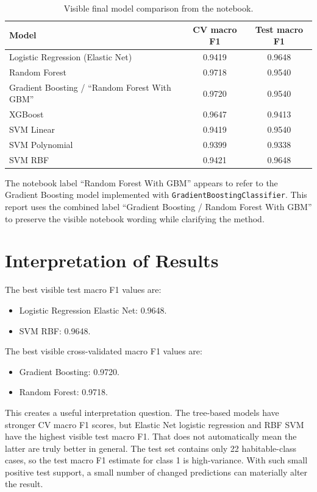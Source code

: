 \documentclass[11pt]{article}
\begin{document}
\begin{table}[H]
\centering
\caption{Visible final model comparison from the notebook.}
\label{tab:model-comparison}
\small
\begin{tabular}{lcc}
\toprule
Model & CV macro F1 & Test macro F1 \\
\midrule
Logistic Regression (Elastic Net) & 0.9419 & 0.9648 \\
Random Forest & 0.9718 & 0.9540 \\
Gradient Boosting / ``Random Forest With GBM'' & 0.9720 & 0.9540 \\
XGBoost & 0.9647 & 0.9413 \\
SVM Linear & 0.9419 & 0.9540 \\
SVM Polynomial & 0.9399 & 0.9338 \\
SVM RBF & 0.9421 & 0.9648 \\
\bottomrule
\end{tabular}
\end{table}

The notebook label ``Random Forest With GBM'' appears to refer to the Gradient Boosting model implemented with \texttt{GradientBoostingClassifier}. This report uses the combined label ``Gradient Boosting / Random Forest With GBM'' to preserve the visible notebook wording while clarifying the method.

\section{Interpretation of Results}

The best visible test macro F1 values are:

\begin{itemize}
  \item Logistic Regression Elastic Net: 0.9648.
  \item SVM RBF: 0.9648.
\end{itemize}

The best visible cross-validated macro F1 values are:

\begin{itemize}
  \item Gradient Boosting: 0.9720.
  \item Random Forest: 0.9718.
\end{itemize}

This creates a useful interpretation question. The tree-based models have stronger CV macro F1 scores, but Elastic Net logistic regression and RBF SVM have the highest visible test macro F1. That does not automatically mean the latter are truly better in general. The test set contains only 22 habitable-class cases, so the test macro F1 estimate for class 1 is high-variance. With such small positive test support, a small number of changed predictions can materially alter the result.
\end{document}
